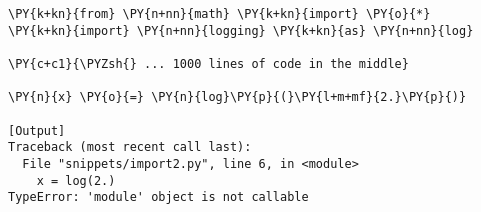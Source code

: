 \begin{Verbatim}[label=\makebox{\url{https://bitbucket.org/lbaldini/programming/src/tip/snippets/import2.py}},commandchars=\\\{\}]
\PY{k+kn}{from} \PY{n+nn}{math} \PY{k+kn}{import} \PY{o}{*}
\PY{k+kn}{import} \PY{n+nn}{logging} \PY{k+kn}{as} \PY{n+nn}{log}

\PY{c+c1}{\PYZsh{} ... 1000 lines of code in the middle}

\PY{n}{x} \PY{o}{=} \PY{n}{log}\PY{p}{(}\PY{l+m+mf}{2.}\PY{p}{)}

[Output]
Traceback (most recent call last):
  File "snippets/import2.py", line 6, in <module>
    x = log(2.)
TypeError: 'module' object is not callable
\end{Verbatim}